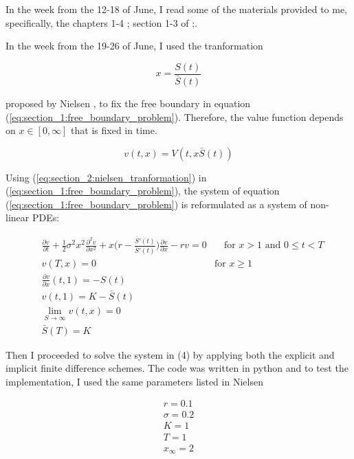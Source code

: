\documentclass[a4paper,12pt]{article}
\begin{document}
  In the week from the 12-18 of June, I read some of the materials provided to me, specifically, 
  the chapters 1-4 \cite*{hilber_reichmann_schwab_winter_2013}; section 1-3 of \cite*{nielsen_2001};.

  In the week from the 19-26 of June, I used the tranformation 
  
  \begin{equation}
    x = \frac{S(t)}{\bar{S}(t)}
    \label{eq:section_2:nielsen_tranformation}
  \end{equation}

  proposed by Nielsen \cite*{nielsen_2001}, to fix the free boundary in equation 
  (\ref{eq:section_1:free_boundary_problem}). Therefore, the value function
  depends on $x \in [0, \infty]$ that is fixed in time.

  \begin{equation}
    v(t, x) = V(t, x\bar{S}(t))
  \end{equation}

  Using (\ref{eq:section_2:nielsen_tranformation}) in (\ref{eq:section_1:free_boundary_problem}), 
  the system of equation (\ref{eq:section_1:free_boundary_problem}) is 
  reformulated as a system of non-linear PDEs: 

  \begin{equation}
    \begin{aligned}
      & \frac{\partial v}{\partial t} + \frac{1}{2}\sigma^2 x^2 \frac{\partial^2 v}{\partial x^2} + x\bigg(r - \frac{\bar{S}'(t)}{\bar{S}'(t)}\bigg)\frac{\partial v}{\partial x} - rv = 0 & \quad \text{for $x > 1$ and $0 \leq t < T$} \\
      & v(T, x) = 0 & \text{for $x \geq 1$} \\
      & \frac{\partial v}{\partial x}(t, 1) = -S(t) \\
      & v(t, 1) = K - \bar{S}(t) \\
      & \lim_{S \rightarrow \infty} v(t, x) = 0 \\
      & \bar{S}(T) = K
    \end{aligned}   
    \label{eq:section_2:nielsen_pde_system}
  \end{equation}

  Then I proceeded to solve the system in (4) by applying both the explicit and implicit finite difference schemes. 
  The code was written in python and to test the implementation, I used the same parameters listed in Nielsen \cite*{nielsen_2001}

  \begin{align*}
    r = 0.1 \\
    \sigma = 0.2 \\
    K = 1 \\
    T = 1 \\
    x_{\infty} = 2 \\
  \end{align*}
\end{document}
